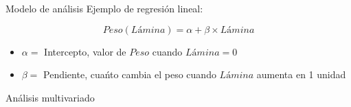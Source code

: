 \documentclass[
  11pt,
  ignorenonframetext,
]{beamer}
\providecommand{\tightlist}{%
  \setlength{\itemsep}{0pt}\setlength{\parskip}{0pt}}
\begin{document}
\begin{frame}{Modelo de análisis}
\protect\hypertarget{modelo-de-anuxe1lisis-1}{}
Ejemplo de regresión lineal:

\[ Peso(Lámina) = \alpha + \beta \times Lámina \]

\begin{itemize}
\tightlist
\item
  \(\alpha =\) Intercepto, valor de \(Peso\) cuando \(Lámina = 0\)
\item
  \(\beta =\) Pendiente, cuańto cambia el peso cuando \(Lámina\) aumenta
  en 1 unidad
\end{itemize}
\end{frame}

\begin{frame}{Análisis multivariado}
\protect\hypertarget{anuxe1lisis-multivariado}{}
\end{frame}
\end{document}
